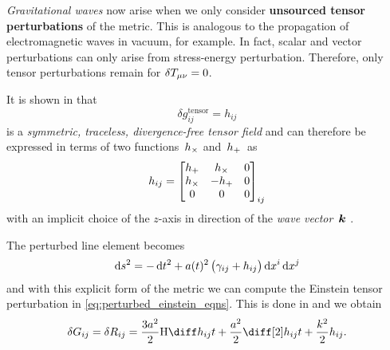 \documentclass[parskip=half]{scrreprt}
\begin{document}
\emph{Gravitational waves} now arise when we only consider \textbf{unsourced tensor perturbations} of the metric. This is analogous to the propagation of electromagnetic waves in vacuum, for example.  In fact, scalar and vector perturbations can only arise from stress-energy perturbation.  Therefore, only tensor perturbations remain for \(\delta T_{\mu \nu}=0\).

It is shown in  that
\begin{equation}
	\delta g^{\mathrm{tensor}}_{ij} = h_{ij}
\end{equation}
is a \emph{symmetric, traceless, divergence-free tensor field} and can therefore be expressed in terms of two functions~\(h_\times\) and~\(h_+\)~as
\begin{equation}
	h_{ij} =
	\begin{bmatrix}
		h_+ & h_\times & 0 \\
		h_\times & -h_+ & 0 \\
		0 & 0 & 0
	\end{bmatrix}_{ij}
\end{equation}
with an implicit choice of the \(z\)-axis in direction of the \emph{wave vector}~\(\boldsymbol{k}\) \citep{Dodelson}. 

The perturbed line element becomes
\begin{equation}
	\dif{s}^2 = -\dif{t}^2 + a(t)^2 \del{\gamma_{ij} + h_{ij}} \dif{x^i}\dif{x^j}
\end{equation}
and with this explicit form of the metric we can compute the Einstein tensor perturbation in \eqref{eq:perturbed_einstein_eqns}. This is done in  and we obtain
\begin{align}\label{eq:evolution}
	\delta\Gtens_{ij} = \delta\Rtens_{ij} = \frac{3 a^2}{2} \Hcosm \dt{h_{ij}} + \frac{a^2}{2}\ddt{h_{ij}} + \frac{k^2}{2}h_{ij} \eqpunct{.}
\end{align}
\end{document}

